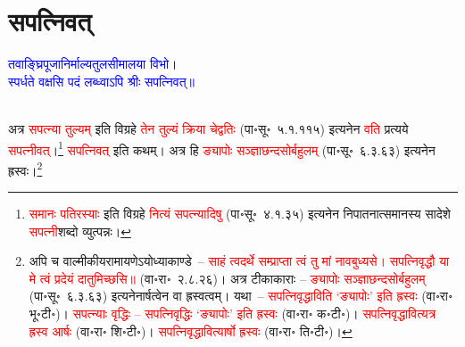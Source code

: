 \section[सपत्निवत्]{सपत्निवत्}
\centering\textcolor{blue}{तवाङ्घ्रिपूजानिर्माल्यतुलसीमालया विभो।\nopagebreak\\
स्पर्धते वक्षसि पदं लब्ध्वाऽपि श्रीः सपत्निवत्॥}\nopagebreak\\
\\
\begin{sloppypar}\justifying\noindent\hspace{10mm} अत्र \textcolor{red}{सपत्न्या तुल्यम्} इति विग्रहे \textcolor{red}{तेन तुल्यं क्रिया चेद्वतिः} (पा॰सू॰~५.१.११५) इत्यनेन \textcolor{red}{वति} प्रत्यये \textcolor{red}{सपत्नीवत्}।\footnote{\textcolor{red}{समानः पतिरस्याः} इति विग्रहे \textcolor{red}{नित्यं सपत्न्यादिषु} (पा॰सू॰~४.१.३५) इत्यनेन निपातनात्समानस्य सादेशे \textcolor{red}{सपत्नी}\-शब्दो व्युत्पन्नः।} \textcolor{red}{सपत्निवत्} इति कथम्।
अत्र हि \textcolor{red}{ङ्यापोः सञ्ज्ञा\-छन्दसोर्बहुलम्} (पा॰सू॰~६.३.६३) इत्यनेन ह्रस्वः।\footnote{अपि च वाल्मीकीय\-रामायणेऽयोध्या\-काण्डे~– \textcolor{red}{साहं त्वदर्थे सम्प्राप्ता त्वं तु मां नावबुध्यसे। सपत्निवृद्धौ या मे त्वं प्रदेयं दातुमिच्छसि॥} (वा॰रा॰~२.८.२६)। अत्र टीकाकाराः – \textcolor{red}{ङ्यापोः सञ्ज्ञा\-छन्दसोर्बहुलम्} (पा॰सू॰~६.३.६३) इत्यनेनार्षत्वेन वा ह्रस्वत्वम्। यथा~– \textcolor{red}{सपत्निवृद्धाविति ‘ङ्यापोः’ इति ह्रस्वः} (वा॰रा॰ भू॰टी॰)। \textcolor{red}{सपत्न्याः वृद्धिः – सपत्निवृद्धिः ‘ङ्यापोः’ इति ह्रस्वः} (वा॰रा॰ क॰टी॰)। \textcolor{red}{सपत्निवृद्धावित्यत्र ह्रस्व आर्षः} (वा॰रा॰ शि॰टी॰)। \textcolor{red}{सपत्निवृद्धावित्यार्षो ह्रस्वः} (वा॰रा॰ ति॰टी॰)।}\end{sloppypar}
